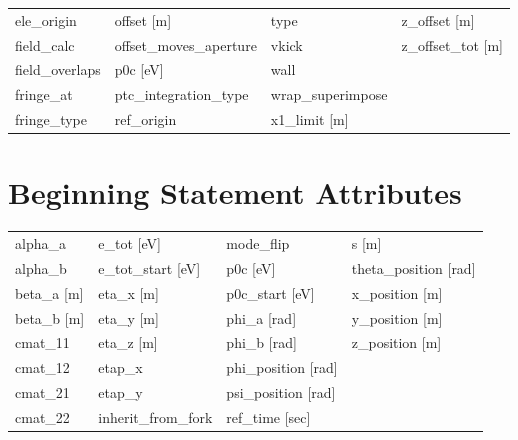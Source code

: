 \begin{tabular}{llll}
ele_origin                       & offset [m]                       & type                             & z_offset [m]                     \\
field_calc                       & offset_moves_aperture            & vkick                            & z_offset_tot [m]                 \\
field_overlaps                   & p0c [eV]                         & wall                             &                                  \\
fringe_at                        & ptc_integration_type             & wrap_superimpose                 &                                  \\
fringe_type                      & ref_origin                       & x1_limit [m]                     &                                  \\
 \bottomrule
 \end{tabular}
 \vfill
 
 \section{Beginning Statement Attributes}
 \label{s:list.beginning}
 
 \begin{tabular}{llll} \toprule
alpha_a                          & e_tot [eV]                       & mode_flip                        & s [m]                            \\
alpha_b                          & e_tot_start [eV]                 & p0c [eV]                         & theta_position [rad]             \\
beta_a [m]                       & eta_x [m]                        & p0c_start [eV]                   & x_position [m]                   \\
beta_b [m]                       & eta_y [m]                        & phi_a [rad]                      & y_position [m]                   \\
cmat_11                          & eta_z [m]                        & phi_b [rad]                      & z_position [m]                   \\
cmat_12                          & etap_x                           & phi_position [rad]               &                                  \\
cmat_21                          & etap_y                           & psi_position [rad]               &                                  \\
cmat_22                          & inherit_from_fork                & ref_time [sec]                   &                                  \\
 \bottomrule
 \end{tabular}
 \vfill
 
